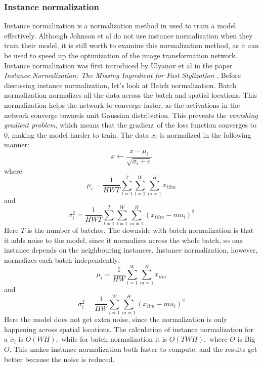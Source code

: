 \subsubsection{Instance normalization}
\label{sec:instance_normalization}
Instance normalization is a normalization method in used to train a model effectively. Although Johnson et al do not use instance normalization when they train their model, it is still worth to examine this normalization method, as it can be used to speed up the optimization of the image transformation network. Instance normalization was first introduced by Ulyanov et al in the paper \textit{Instance Normalization: The Missing Ingredient for Fast Stylization} \cite{Ulyanov:1}.\newline\newline
Before discussing instance normalization, let's look at Batch normalization. Batch normalization normalizes all the data across the batch and spatial locations. This normalization helps the network to converge faster, as the activations in the network converge towards unit Gaussian distribution. This prevents the \textit{vanishing gradient problem}, which means that the gradient of the loss function converges to $0$, making the model harder to train. The data $x_i$ is normalized in the following manner:
\begin{equation}
    x\leftarrow\frac{x-\mu_i}{\sqrt{\sigma_i+\epsilon}}
\end{equation}
where
\begin{equation}
\mu_i=\frac{1}{HWT}\sum_{t=1}^T\sum_{l=1}^W\sum_{m=1}^H{x_{tilm}}
\end{equation}
and
\begin{equation}
\sigma_i^2=\frac{1}{HWT}\sum_{t=1}^T\sum_{l=1}^W\sum_{m=1}^H{(x_{tilm}-mu_i)^2}
\end{equation}
Here $T$ is the number of batches. The downside with batch normalization is that it adds noise to the model, since it normalizes across the whole batch, so one instance depends on the neighbouring instances.\newline\newline
Instance normalization, however, normalizes each batch independently:
\begin{equation}
\mu_i=\frac{1}{HW}\sum_{l=1}^W\sum_{m=1}^H{x_{ilm}}
\end{equation}
and
\begin{equation}
\sigma_i^2=\frac{1}{HW}\sum_{l=1}^W\sum_{m=1}^H{(x_{ilm}-mu_i)^2}
\end{equation}
Here the model does not get extra noise, since the normalization is only happening across spatial locations. The calculation of instance normalization for a $x_i$ is $O(WH),$ while for batch normalization it is $O(TWH),$ where $O$ is Big $O$. This makes instance normalization both faster to compute, and the results get better because the noise is reduced.